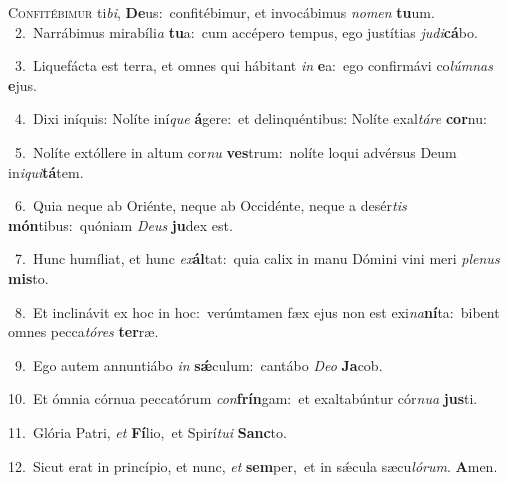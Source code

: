 \lettrine{\initial\textcolor{\initialcolor}{C}}{onfitébimur} ti\-\textit{bi}\-, \textbf{De}\-us:~\star confitébimur, et invocábimus \textit{no}\-\textit{men} \textbf{tu}\-um.\\
{\numbfont\textcolor{\numbcolor}{~2.}}~Narrábimus mirabíli\textit{a} \textbf{tu}\-a:~\star cum accépero tempus, ego justítias \textit{ju}\-\textit{di}\textbf{cá}bo.\par
{\numbfont\textcolor{\numbcolor}{~3.}}~Liquefácta est terra, et omnes qui hábitant \textit{in} \textbf{e}\-a:~\star ego confirmávi co\-\textit{lúm}\-\textit{nas} \textbf{e}\-jus.\par
{\numbfont\textcolor{\numbcolor}{~4.}}~Dixi iníquis: Nolíte iní\textit{que} \textbf{á}\-gere:~\star et delinquéntibus: Nolíte exal\-\textit{tá}\-\textit{re} \textbf{cor}\-nu:\par
{\numbfont\textcolor{\numbcolor}{~5.}}~Nolíte extóllere in altum cor\textit{nu} \textbf{ves}\-trum:~\star nolíte loqui advérsus Deum in\-\textit{i}\-\textit{qui}\textbf{tá}tem.\par
{\numbfont\textcolor{\numbcolor}{~6.}}~Quia neque ab Oriénte, neque ab Occidénte, neque a desér\textit{tis} \textbf{món}\-tibus:~\star quóniam \textit{De}\-\textit{us} \textbf{ju}\-dex est.\par
{\numbfont\textcolor{\numbcolor}{~7.}}~Hunc humíliat, et hunc \textit{ex}\-\textbf{ál}tat:~\star quia calix in manu Dómini vini meri \textit{ple}\-\textit{nus} \textbf{mis}\-to.\par
{\numbfont\textcolor{\numbcolor}{~8.}}~Et inclinávit ex hoc in hoc:~\dagger verúmtamen fæx ejus non est exi\-\textit{na}\-\textbf{ní}ta:~\star bibent omnes pecca\-\textit{tó}\-\textit{res} \textbf{ter}\-ræ.\par
{\numbfont\textcolor{\numbcolor}{~9.}}~Ego autem annuntiábo \textit{in} \textbf{sǽ}\-culum:~\star cantábo \textit{De}\-\textit{o} \textbf{Ja}\-cob.\par
{\numbfont\textcolor{\numbcolor}{10.}}~Et ómnia córnua peccatórum \textit{con}\-\textbf{frín}gam:~\star et exaltabúntur cór\-\textit{nu}\-\textit{a} \textbf{jus}\-ti.\par
{\numbfont\textcolor{\numbcolor}{11.}}~Glória Patri, \textit{et} \textbf{Fí}\-lio,~\star et Spirí\-\textit{tu}\-\textit{i} \textbf{Sanc}\-to.\par
{\numbfont\textcolor{\numbcolor}{12.}}~Sicut erat in princípio, et nunc, \textit{et} \textbf{sem}\-per,~\star et in sǽcula sæcu\-\textit{ló}\-\textit{rum}. \textbf{A}\-men.\par

